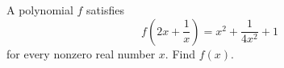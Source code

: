 A polynomial $f$ satisfies
\[f\left(2x+\dfrac1x\right)=x^2+\dfrac{1}{4x^2}+1\]
for every nonzero real number $x$. Find $f(x)$.
